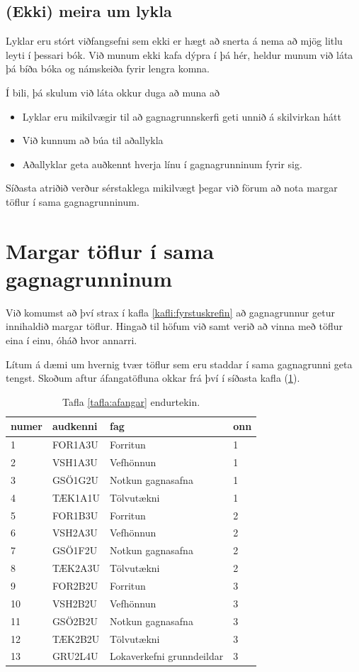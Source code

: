 \subsection{(Ekki) meira um lykla}
Lyklar eru stórt viðfangsefni sem ekki er hægt að snerta á nema að mjög litlu leyti í þessari bók. Við munum ekki kafa dýpra í þá hér, heldur munum við láta þá bíða bóka og námskeiða fyrir lengra komna.

Í bili, þá skulum við láta okkur duga að muna að
\begin{itemize}
 \item Lyklar eru mikilvægir til að gagnagrunnskerfi geti unnið á skilvirkan hátt
 \item Við kunnum að búa til aðallykla 
 \item Aðallyklar geta auðkennt hverja línu í gagnagrunninum fyrir sig.
\end{itemize}
Síðasta atriðið verður sérstaklega mikilvægt þegar við förum að nota margar töflur í sama gagnagrunninum.
\section{Margar töflur í sama gagnagrunninum}
Við komumst að því strax í kafla \ref{kafli:fyrstuskrefin} að gagnagrunnur getur innihaldið margar töflur. Hingað til höfum við samt verið að vinna með töflur eina í einu, óháð hvor annarri.

Lítum á dæmi um hvernig tvær töflur sem eru staddar í sama gagnagrunni geta tengst. Skoðum aftur áfangatöfluna okkar frá því í síðasta kafla (\ref{tafla:afangar-aftur}).

\begin{table}
\centering
\caption[Áfangar]{Tafla \ref{tafla:afangar} endurtekin.}
\label{tafla:afangar-aftur}
\begin{tabular}{llll}
\toprule
numer&audkenni&fag&onn\\
\midrule
1&	FOR1A3U&	Forritun&		1\\
2&	VSH1A3U&	Vefhönnun&		1\\
3&	GSÖ1G2U&	Notkun gagnasafna&	1\\
4&	TÆK1A1U&	Tölvutækni&		1\\
5&	FOR1B3U&	Forritun&		2\\
6&	VSH2A3U&	Vefhönnun&		2\\
7&	GSÖ1F2U&	Notkun gagnasafna&	2\\
8&	TÆK2A3U&	Tölvutækni&		2\\
9&	FOR2B2U&	Forritun&		3\\
10&	VSH2B2U&	Vefhönnun&		3\\
11&	GSÖ2B2U&	Notkun gagnasafna&	3\\
12&	TÆK2B2U&	Tölvutækni&		3\\
13&	GRU2L4U&	Lokaverkefni grunndeildar&3\\
\bottomrule
\end{tabular}
\end{table}

